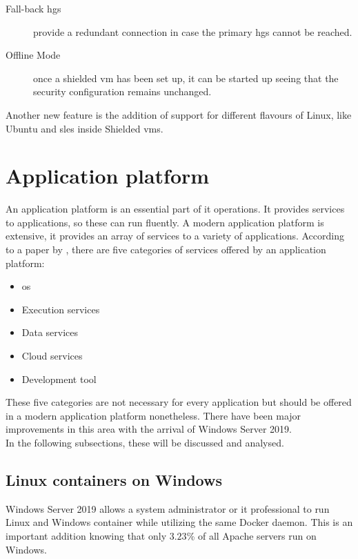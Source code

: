 \begin{description}
	\item[Fall-back \acrshort{hgs}] provide a redundant connection in case the primary \acrshort{hgs} cannot be reached.
	\item[Offline Mode] once a shielded \acrshort{vm} has been set up, it can be started up seeing that the security configuration remains unchanged.
\end{description}

Another new feature is the addition of support for different flavours of Linux, like Ubuntu and \acrfull{sles} inside Shielded \acrshort{vm}s. 

\clearpage

\section{Application platform}
An application platform is an essential part of \acrshort{it} operations. 
It provides services to applications, so these can run fluently. 
A modern application platform is extensive, it provides an array of services to a variety of applications. 
According to a paper by \textcite{Chappell2011}, there are five categories of services offered by an application platform:

\begin{itemize}
	\item \acrshort{os}
	\item Execution services
	\item Data services
	\item Cloud services
	\item Development tool
\end{itemize}

These five categories are not necessary for every application but should be offered in a modern application platform nonetheless.
There have been major improvements in this area with the arrival of Windows Server 2019. \autocite{Gerend2018} 
\\
In the following subsections, these will be discussed and analysed.

\subsection*{Linux containers on Windows}
Windows Server 2019 allows a system administrator or \acrshort{it} professional to run Linux and Windows container while utilizing the same Docker daemon. 
This is an important addition knowing that only {$3.23$}\% of all Apache servers run on Windows. \autocite{SecuritySpace2019}
